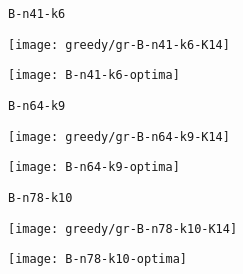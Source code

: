 \begin{figure}[H]
	\begin{minipage}{0.15\textwidth}
		\centering
		\texttt{B-n41-k6}
	\end{minipage}%
	\begin{minipage}{0.40\textwidth}
		\centering
		\texttt{[image: greedy/gr-B-n41-k6-K14]}\par
	\end{minipage}%
	\hspace{0.03\textwidth}
	\begin{minipage}{0.40\textwidth}
		\centering
		\texttt{[image: B-n41-k6-optima]}\par
	\end{minipage}%
\end{figure}

\begin{figure}[H]
	\begin{minipage}{0.15\textwidth}
		\centering
		\texttt{B-n64-k9}
	\end{minipage}%
	\begin{minipage}{0.40\textwidth}
		\centering
		\texttt{[image: greedy/gr-B-n64-k9-K14]}\par
	\end{minipage}%
	\hspace{0.03\textwidth}
	\begin{minipage}{0.40\textwidth}
		\centering
		\texttt{[image: B-n64-k9-optima]}\par
	\end{minipage}%
\end{figure}

\begin{figure}[H]
	\begin{minipage}{0.15\textwidth}
		\centering
		\texttt{B-n78-k10}
	\end{minipage}%
	\begin{minipage}{0.40\textwidth}
		\centering
		\texttt{[image: greedy/gr-B-n78-k10-K14]}\par
	\end{minipage}%
	\hspace{0.03\textwidth}
	\begin{minipage}{0.40\textwidth}
		\centering
		\texttt{[image: B-n78-k10-optima]}\par
	\end{minipage}%
\end{figure}
